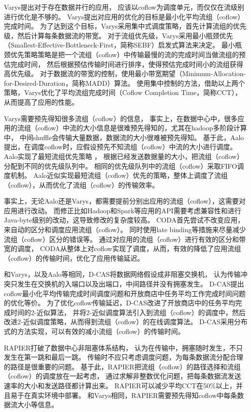 Varys\cite{chowdhury2014efficient}提出对于存在数据并行的应用，
应该以coflow\cite{chowdhury2012coflow}为调度单元，而仅仅在流级别进行优化是不够的。
Varys提出对应用的优化的目标是最小化平均流组（coflow）完成时间。
为了达到这个目标，Varys采用集中式调度策略，首先计算流组的优先级，然后计算每条数据流的带宽。
对于流组优先级，Varys采用最小瓶颈优先（Smallest-Effective-Bottleneck-First，简称SEBF）启发式算法来决定。
最小瓶颈优先策略策略是把一个流组（coflow）中传输最慢的流的完成时间当做流组的预估完成时间，
然后根据预估传输时间进行排序，使得预估完成时间小的流组获得高优先级。
对于数据流的带宽的控制，使用最小带宽期望（Minimum-Allocation-for-Desired-Duration，简称MADD）算法。
使用集中控制的方法，借助以上两个策略，Varys优化了平均流组完成时间（Coflow Completion Time，简称CCT），从而提高了应用的性能。

Varys需要预先得知很多流组（coflow）的信息，
事实上，在数据中心中，很多应用的流组（coflow）中流的大小信息是很难预先得知的，尤其在hadoop多阶段计算中，
中间shuffle会传输大量数据，数据流的大小很难被预先得知。
基于此，Aalo\cite{chowdhury2015efficient}提出，在调度coflow时，应假设预先不知流组（coflow）中流的大小进行调度。
Aalo实现了最短流组优先策略 ，
根据已经发送数据量的大小，把流组（coflow） 分配到不同的优先级队列中。
相同的优先级队列中的流组（coflow）采取FIFO调度机制。
Aalo近似实现最短流组（coflow）优先的策略，整体上调度了流组（coflow），从而优化了流组（coflow）的传输效率。

事实上，无论Aalo还是Varys，都需要提前分别出应用的流组（coflow），这需要对应用进行改动。
而修正比如Hadoop和Spark等应用的API需要考虑兼容性和进行Java-byte级别的改动，这导致修改的复杂度较高。
CODA\cite{zhang2016coda}首先尝试不改变应用，来自动的区分和调度应用流组（coflow）。
同时使用late binding等措施来尽量减少流组（coflow）区分的错误等。
通过对应用的流组（coflow）进行有效的区分和带宽的调度，
CODA从整体上对coflow实现了调度，从而，有效的降低了应用流组（coflow）的传输时间，优化了应用传输延迟。


和Varys，以及Aalo等相同，D-CAS\cite{luo2016towards}将数据网络假设成非阻塞交换机，
认为传输冲突只发生在交换机的入端口以及出端口，中间路径并没有拥塞发生。
D-CAS提出coflow最小化平均传输完成时间调度问题和开放商店中任务平均工作完成时间问题的优化等价。
为了优化coflow传输延迟，D-CAS改进了开放商店中的任务平均完成时间的2-近似算法\cite{roemer2006note}，
并将2-近似调度算法引入到流组（coflow）的调度中，然后改进2-近似调度策略，从而得到流组（coflow）的在线调度算法。
D-CAS采用分布式的方法实现，可以有效的减小流组（coflow）的传输时间。



RAPIER\cite{zhao2015rapier}打破了数据中心非阻塞体系结构，
认为在传输中，拥塞随时发生，不只发生在第一跳和最后一跳。
传输时不应只考虑调度问题，为每条数据流分配合理的路径是很重要的问题。
基于此，RAPIER把流组（coflow）的路径选择和流组（coflow）的调度放在一起考虑，
通过求解非整数优化问题，把每条数据流发送速率的大小和发送路径都计算出来。
RAPIER可以减少平均CCT在50$\%$以上，并且易于在真实环境中部署。
和Varys相同，RAPIER需要预先得知coflow中每条数据流大小等信息。


